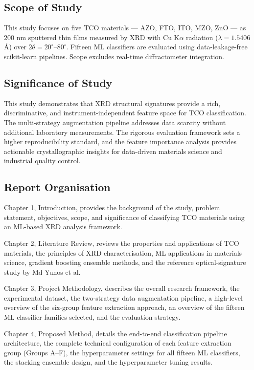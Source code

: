 \documentclass[12pt, oneside]{article} %
\begin{document}
\subsection{Scope of Study}

This study focuses on five TCO materials --- AZO, FTO, ITO, MZO, ZnO --- as 200 nm sputtered thin films measured by XRD with Cu K$\alpha$ radiation ($\lambda = 1.5406$ \AA) over $2\theta = 20^{\circ}$--$80^{\circ}$. Fifteen ML classifiers are evaluated using data-leakage-free scikit-learn pipelines. Scope excludes real-time diffractometer integration.


\subsection{Significance of Study}

This study demonstrates that XRD structural signatures provide a rich, discriminative, and instrument-independent feature space for TCO classification. The multi-strategy augmentation pipeline addresses data scarcity without additional laboratory measurements. The rigorous evaluation framework sets a higher reproducibility standard, and the feature importance analysis provides actionable crystallographic insights for data-driven materials science and industrial quality control.


\subsection{Report Organisation}

Chapter 1, Introduction, provides the background of the study, problem statement, objectives, scope, and significance of classifying TCO materials using an ML-based XRD analysis framework.

Chapter 2, Literature Review, reviews the properties and applications of TCO materials, the principles of XRD characterisation, ML applications in materials science, gradient boosting ensemble methods, and the reference optical-signature study by Md Yunos et al.

Chapter 3, Project Methodology, describes the overall research framework, the experimental dataset, the two-strategy data augmentation pipeline, a high-level overview of the six-group feature extraction approach, an overview of the fifteen ML classifier families selected, and the evaluation strategy.

Chapter 4, Proposed Method, details the end-to-end classification pipeline architecture, the complete technical configuration of each feature extraction group (Groups A--F), the hyperparameter settings for all fifteen ML classifiers, the stacking ensemble design, and the hyperparameter tuning results.
\end{document}

